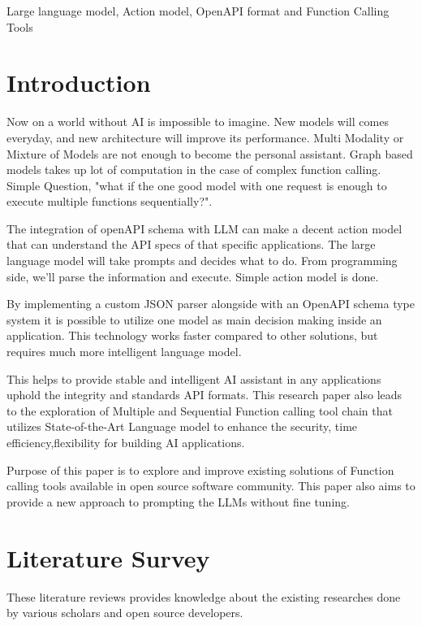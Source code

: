 \documentclass[conference]{IEEEtran}
\begin{document}
\begin{IEEEkeywords}
Large language model, Action model, OpenAPI format and Function Calling Tools
\end{IEEEkeywords}

\section{Introduction}
Now on a world without AI is impossible to imagine. New models will comes everyday, and new architecture will improve its performance. Multi Modality or Mixture of Models are not enough to become the personal assistant. Graph based models takes up lot of computation in the case of complex function calling. Simple Question, "what if the one good model with one request is enough to execute multiple functions sequentially?".

The integration of openAPI schema with LLM can make a decent action model that can understand the API specs of that specific applications. The large language model will take prompts and decides what to do. From programming side, we'll parse the information and execute. Simple action model is done. 

By implementing a custom JSON parser alongside with an OpenAPI schema type system it is possible to utilize one model as main decision making inside an application. This technology works faster compared to other solutions, but requires much more intelligent language model.

This helps to provide stable and intelligent AI assistant in any applications uphold the integrity and standards API formats. This research paper also leads to the exploration of Multiple and Sequential Function calling tool chain that utilizes State-of-the-Art Language model to enhance the security, time efficiency,flexibility for building AI applications. 

Purpose of this paper is to explore and improve existing solutions of Function calling tools available in open source software community. This paper also aims to provide a new approach to prompting the LLMs without fine tuning.

\section{Literature Survey}
These literature reviews provides knowledge about the existing researches done by various scholars and open source developers. 
\end{document}
